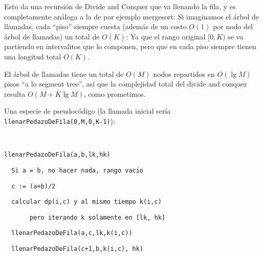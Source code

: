 \documentclass{article}
\def\lg{\mathop{\mathrm {lg}}\nolimits}
\begin{document}
Esto da una recursión de Divide and Conquer que va llenando la fila, y es completamente análoga a la de por ejemplo mergesort: Si imaginamos el árbol
de llamadas, cada ``piso'' siempre cuesta (además de un costo $O(1)$ por nodo del árbol de llamadas) un total de $O(K)$: Ya que el rango original
$[0,K)$ se va partiendo en intervalitos que lo componen, pero que en cada piso siempre tienen una longitud total $O(K)$.

El árbol de llamadas tiene un
total de $O(M)$ nodos repartidos en $O(\lg M)$ pisos ``a lo segment tree'', así que la complejidad total del divide and conquer resulta $O(M+K\lg M)$,
como prometimos.

Una especie de pseudocódigo (la llamada inicial sería \texttt{llenarPedazoDeFila(0,M,0,K-1)}):

\ 

\texttt{llenarPedazoDeFila(a,b,lk,hk)}

\texttt{\ \   Si a = b, no hacer nada, rango vacio}
         
\texttt{\  \  c := (a+b)/2}
         
\texttt{\  \  calcular dp(i,c) y al mismo tiempo k(i,c)}
         
\texttt{\    \ \ \ \ \ \         pero iterando k solamente en [lk, hk]}

\texttt{\  \  llenarPedazoDeFila(a,c,lk,k(i,c))}

\texttt{\  \  llenarPedazoDeFila(c+1,b,k(i,c), hk)}
\end{document}
